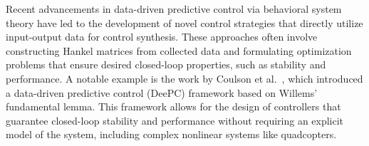 Recent advancements in data-driven predictive control via behavioral system theory have led to the development of novel control strategies that directly utilize input-output data for control synthesis. These approaches often involve constructing Hankel matrices from collected data and formulating optimization problems that ensure desired closed-loop properties, such as stability and performance. A notable example is the work by Coulson et al.~\cite{jeremy2019}, which introduced a data-driven predictive control (DeePC) framework based on Willems' fundamental lemma. This framework allows for the design of controllers that guarantee closed-loop stability and performance without requiring an explicit model of the system, including complex nonlinear systems like quadcopters.


